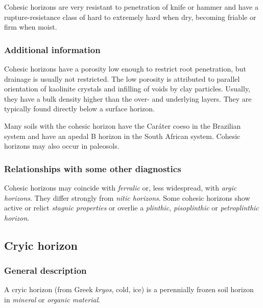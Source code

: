 \documentclass[
  letterpaper,
  DIV=11,
  numbers=noendperiod]{scrreprt}
\begin{document}
Cohesic horizons are very resistant to penetration of knife or hammer
and have a rupture-resistance class of hard to extremely hard when dry,
becoming friable or firm when moist.

\hypertarget{additional-information-3}{%
\subsubsection{Additional information}\label{additional-information-3}}

Cohesic horizons have a porosity low enough to restrict root
penetration, but drainage is usually not restricted. The low porosity is
attributed to parallel orientation of kaolinite crystals and infilling
of voids by clay particles. Usually, they have a bulk density higher
than the over- and underlying layers. They are typically found directly
below a surface horizon.

Many soils with the cohesic horizon have the Caráter coeso in the
Brazilian system and have an apedal B horizon in the South African
system. Cohesic horizons may also occur in paleosols.

\hypertarget{relationships-with-some-other-diagnostics-6}{%
\subsubsection{Relationships with some other
diagnostics}\label{relationships-with-some-other-diagnostics-6}}

Cohesic horizons may coincide with \emph{ferralic} or, less widespread,
with \emph{argic horizons}. They differ strongly from \emph{nitic
horizons}. Some cohesic horizons show active or relict \emph{stagnic
properties} or overlie a \emph{plinthic}, \emph{pisoplinthic} or
\emph{petroplinthic horizon}.

\hypertarget{cryic-horizon}{%
\subsection{Cryic horizon}\label{cryic-horizon}}

\hypertarget{general-description-7}{%
\subsubsection{General description}\label{general-description-7}}

A cryic horizon (from Greek \emph{kryos}, cold, ice) is a perennially
frozen soil horizon in \emph{mineral} or \emph{organic material}.
\end{document}
